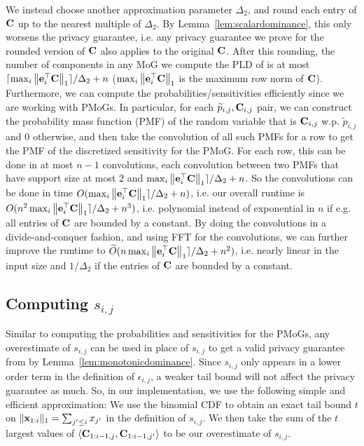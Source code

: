 We instead choose another approximation parameter $\Delta_2$, and round each entry of $\mathbf{C}$ up to the nearest multiple of $\Delta_2$. By Lemma~\ref{lem:scalardominance}, this only worsens the privacy guarantee, i.e. any privacy guarantee we prove for the rounded version of $\mathbf{C}$ also applies to the original $\mathbf{C}$. After this rounding, the number of components in any MoG we compute the PLD of is at most $\lceil \max_i \left\|\mathbf{e}_i^\top \mathbf{C}\right\|_1\rceil / \Delta_2 + n$ ($\max_i \left\|\mathbf{e}_i^\top \mathbf{C}\right\|_1$ is the maximum row norm of $\mathbf{C}$). Furthermore, we can compute the probabilities/sensitivities efficiently since we are working with PMoGs. In particular, for each $\widetilde{p}_{i,j}, \mathbf{C}_{i,j}$ pair, we can construct the probability mass function (PMF) of the random variable that is $\mathbf{C}_{i,j}$ w.p. $\tilde{p}_{i,j}$ and 0 otherwise, and then take the convolution of all such PMFs for a row to get the PMF of the discretized sensitivity for the PMoG. For each row, this can be done in at most $n-1$ convolutions, each convolution between two PMFs that have support size at most $2$ and $\max_i \left\|\mathbf{e}_i^\top \mathbf{C}\right\|_1\rceil / \Delta_2 + n$. So the convolutions can be done in time $O(\max_i \left\|\mathbf{e}_i^\top \mathbf{C}\right\|_1\rceil / \Delta_2 + n)$, i.e. our overall runtime is $O(n^2 \max_i \left\|\mathbf{e}_i^\top \mathbf{C}\right\|_1\rceil / \Delta_2 + n^3)$, i.e. polynomial instead of exponential in $n$ if e.g. all entries of $\mathbf{C}$ are bounded by a constant. By doing the convolutions in a divide-and-conquer fashion, and using FFT for the convolutions, we can further improve the runtime to $\widetilde{O}(n \max_i \left\|\mathbf{e}_i^\top \mathbf{C}\right\|_1\rceil / \Delta_2 + n^2)$, i.e. nearly linear in the input size and $1/\Delta_2$ if the entries of $\mathbf{C}$ are bounded by a constant.

\subsection{Computing $s_{i,j}$}

Similar to computing the probabilities and sensitivities for the PMoGs, any overestimate of $s_{i,j}$ can be used in place of $s_{i,j}$ to get a valid privacy guarantee from \CPTB{} by Lemma~\ref{lem:monotonicdominance}. 
Since $s_{i,j}$ only appears in a lower order term in the definition of $\epsilon_{i,j}$, a weaker tail bound will not affect the privacy guarantee as much. So, in our implementation, we use the following simple and efficient approximation: We use the binomial CDF to obtain an exact tail bound $t$ on $\|\mathbf{x}_{1:i}\|_1 = \sum_{j' \leq i} x_{j'}$ in the definition of $s_{i,j}$. We then take the sum of the $t$ largest values of $\langle \mathbf{C}_{1:i-1,j}, \mathbf{C}_{1:i-1,j'} \rangle$ to be our overestimate of $s_{i,j}$.

